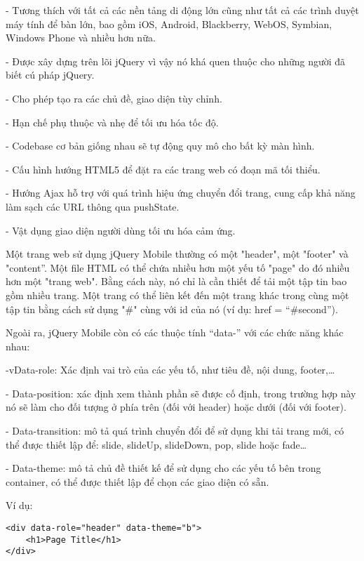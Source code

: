 \quad - Tương thích với tất cả các nền tảng di động lớn cũng như tất cả các trình duyệt máy tính để bàn lớn, bao gồm iOS, Android, Blackberry, WebOS, Symbian, Windows Phone và nhiều hơn nữa.

\quad - Được xây dựng trên lõi jQuery vì vậy nó khá quen thuộc cho những người đã biết cú pháp jQuery.

\quad - Cho phép tạo ra các chủ đề, giao diện tùy chỉnh.

\quad - Hạn chế phụ thuộc và nhẹ để tối ưu hóa tốc độ.

\quad - Codebase cơ bản giống nhau sẽ tự động quy mô cho bất kỳ màn hình.

\quad - Cấu hình hướng HTML5 để đặt ra các trang web có đoạn mã tối thiểu.

\quad - Hướng Ajax hỗ trợ với quá trình hiệu ứng chuyển đổi trang, cung cấp khả năng làm sạch các URL thông qua pushState.

\quad - Vật dụng giao diện người dùng tối ưu hóa cảm ứng.

Một trang web sử dụng jQuery Mobile thường có một "header", một "footer" và "content”. Một file HTML có thể chứa nhiều hơn một yếu tố "page" do đó nhiều hơn một "trang web". Bằng cách này, nó chỉ là cần thiết để tải một tập tin bao gồm nhiều trang. Một trang có thể liên kết đến một trang khác trong cùng một tập tin bằng cách sử dụng "\#" cùng với id của nó (ví dụ: href = “\#second”).

Ngoài ra, jQuery Mobile còn có các thuộc tính “data-” với các chức năng khác nhau:

\quad -vData-role: Xác định vai trò của các yếu tố, như tiêu đề, nội dung, footer,…

\quad - Data-position: xác định xem thành phần sẽ được cố định, trong trường hợp này nó sẽ làm cho đối tượng ở phía trên (đối với header) hoặc dưới (đối với footer).

\quad - Data-transition: mô tả quá trình chuyển đổi để sử dụng khi tải trang mới, có thể được thiết lập để: slide, slideUp, slideDown, pop, slide hoặc fade…

\quad - Data-theme: mô tả chủ đề thiết kế để sử dụng cho các yếu tố bên trong container, có thể được thiết lập để chọn các giao diện có sẵn.

Ví dụ:

\begin{lstlisting}
<div data-role="header" data-theme="b"> 
	<h1>Page Title</h1> 
</div>
\end{lstlisting}

